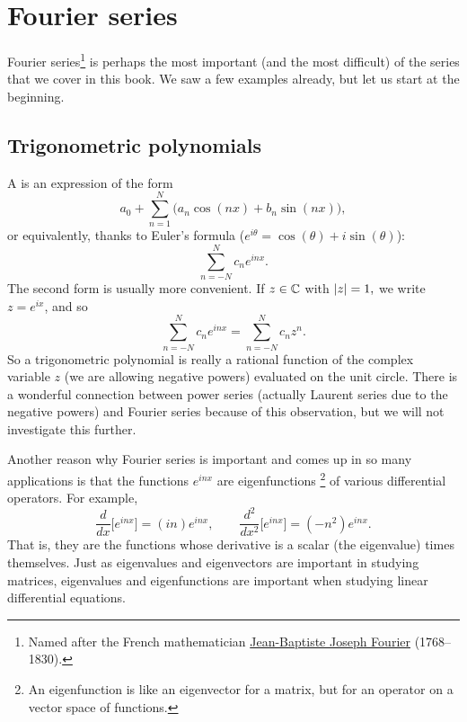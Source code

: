 
\sectionnewpage
\section{Fourier series}
\label{sec:fourier}



Fourier series\footnote{%
Named after the French mathematician
\href{https://en.wikipedia.org/wiki/Joseph_Fourier}{Jean-Baptiste Joseph Fourier}
(1768--1830).} is perhaps the most important (and the most difficult)
of the series that we cover in
this book.  We saw a few examples already,
but let us start
at the beginning.

\subsection{Trigonometric polynomials}

A \emph{} is an expression of the form
\begin{equation*}
a_0 + \sum_{n=1}^N \bigl(a_n \cos(nx) + b_n \sin(nx) \bigr),
\end{equation*}
or equivalently, thanks to Euler's formula ($e^{i\theta} = \cos(\theta) + i
\sin(\theta)$):
\begin{equation*}
\sum_{n=-N}^N c_n e^{inx} .
\end{equation*}
The second form is usually more convenient.  If
$z \in {\mathbb{C}}$ with $\lvert {z} \rvert=1,$ we write $z = e^{ix}$, and so
\begin{equation*}
\sum_{n=-N}^N c_n e^{inx} = 
\sum_{n=-N}^N c_n z^n .
\end{equation*}
So a trigonometric polynomial is really a rational function
of the complex variable $z$
(we are allowing negative powers) evaluated on the unit circle.  There is
a wonderful connection between power series
(actually Laurent series due to the negative powers) and
Fourier series because of this observation,
but we will not investigate this further.

\medskip

Another reason why Fourier series is important and comes up in so many
applications is that the functions $e^{inx}$ are eigenfunctions%
\footnote{An eigenfunction is like an eigenvector for a matrix, but for an
operator on a vector space of functions.} of various
differential operators.  For example,
\begin{equation*}
\frac{d}{dx} \bigl[ e^{inx} \bigr] = (in) e^{inx}, \qquad
\frac{d^2}{dx^2} \bigl[ e^{inx} \bigr] = (-n^2) e^{inx} .
\end{equation*}
That is, they are the functions whose derivative is a scalar (the
eigenvalue) times themselves.
Just as eigenvalues and eigenvectors are important in studying matrices,
eigenvalues and eigenfunctions are important when studying linear
differential equations.

